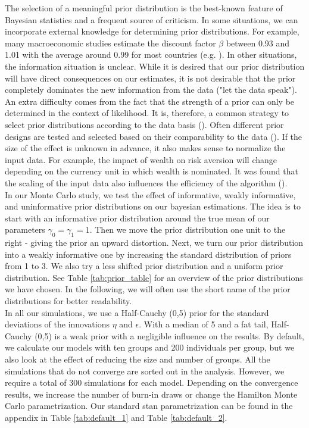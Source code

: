 The selection of a meaningful prior distribution is the best-known feature of Bayesian statistics and a frequent source of criticism. In some situations, we can incorporate external knowledge for determining prior distributions. For example, many macroeconomic studies estimate the discount factor $\beta$ between 0.93 and 1.01 with the average around 0.99 for most countries (e.g. \cite{rumler2007}).
In other situations, the information situation is unclear. While it is desired that our prior distribution will have direct consequences on our estimates, it is not desirable that the prior completely dominates the new information from the data ("let the data speak").\\
An extra difficulty comes from the fact that the strength of a prior can only be determined in the context of likelihood. It is, therefore, a common strategy to select prior distributions according to the data basis (\cite{gelman2017prior}).
Often different prior designs are tested and selected based on their comparability to the data (\cite{leeper2017clearing}).
If the size of the effect is unknown in advance, it also makes sense to normalize the input data. For example, the impact of wealth on risk aversion will change depending on the currency unit in which wealth is nominated. It was found that the scaling of the input data also influences the efficiency of the algorithm (\cite{gelman2008weakly}). \\
In our Monte Carlo study, we test the effect of informative, weakly informative, and uninformative prior distributions on our bayesian estimations.
The idea is to start with an informative prior distribution around the true mean of our parameters $\gamma_0=\gamma_1=1$. Then we move the prior distribution one unit to the right - giving the prior an upward distortion.
Next, we turn our prior distribution into a weakly informative one by increasing the standard distribution of priors from 1 to 3.
We also try a less shifted prior distribution and a uniform prior distribution. See Table \ref{tab:prior_table} for an overview of the prior distributions we have chosen. In the following, we will often use the short name of the prior distributions for better readability.\\
In all our simulations, we use a Half-Cauchy (0,5) prior for the standard deviations of the innovations $\eta$ and $\epsilon$. With a median of 5 and a fat tail, Half-Cauchy (0,5) is a weak prior with a negligible influence on the results.
By default, we calculate our models with ten groups and 200 individuals per group, but we also look at the effect of reducing the size and number of groups. All the simulations that do not converge are sorted out in the analysis.
However, we require a total of 300 simulations for each model. Depending on the convergence results, we increase the number of burn-in draws or change the Hamilton Monte Carlo parametrization. Our standard stan parametrization can be found in the appendix in Table \ref{tab:default_1} and Table \ref{tab:default_2}.



